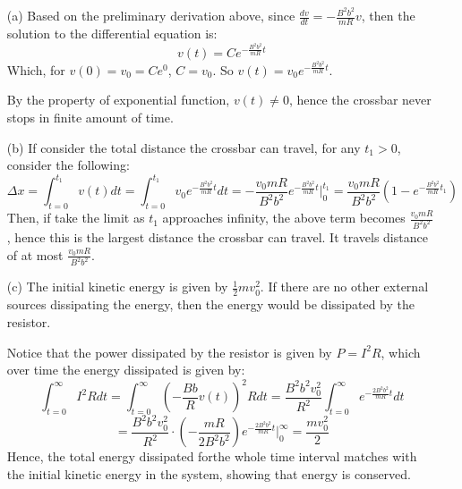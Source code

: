 \documentclass{article}
\begin{document}
\begin{itemize}
    \item[(a)] Based on the preliminary derivation above, since $\frac{dv}{dt}=-\frac{B^2b^2}{mR}v$, then the solution to the differential equation is:
    $$v(t)=Ce^{-\frac{B^2b^2}{mR}t}$$
    Which, for $v(0)=v_0=Ce^0$, $C=v_0$. So $v(t)=v_0e^{-\frac{B^2b^2}{mR}t}$.
    
    By the property of exponential function, $v(t)\neq 0$, hence the crossbar never stops in finite amount of time.

    \hfill

    \item[(b)] If consider the total distance the crossbar can travel, for any $t_1>0$, consider the following:
    $$\Delta x = \int_{t=0}^{t_1}v(t)dt = \int_{t=0}^{t_1}v_0e^{-\frac{B^2b^2}{mR}t}dt = -\frac{v_0mR}{B^2b^2}e^{-\frac{B^2b^2}{mR}t}\bigg|_{0}^{t_1} = \frac{v_0mR}{B^2b^2}\left(1-e^{-\frac{B^2b^2}{mR}t_1}\right)$$
    Then, if take the limit as $t_1$ approaches infinity, the above term becomes $\frac{v_0mR}{B^2b^2}$,
    hence this is the largest distance the crossbar can travel. It travels distance of at most $\frac{v_0mR}{B^2b^2}$.

    \hfill

    \item[(c)] The initial kinetic energy is given by $\frac{1}{2}mv_0^2$. If there are no other external sources dissipating the energy, then the energy would be dissipated by the resistor.
    
    Notice that the power dissipated by the resistor is given by $P=I^2R$, which over time the energy dissipated is given by:
    $$\int_{t=0}^{\infty}I^2Rdt = \int_{t=0}^{\infty}\left(-\frac{Bb}{R}v(t)\right)^2R dt = \frac{B^2b^2v_0^2}{R^2}\int_{t=0}^{\infty}e^{-\frac{2B^2b^2}{mR}t}dt$$
    $$=\frac{B^2b^2v_0^2}{R^2}\cdot\left(-\frac{mR}{2B^2b^2}\right)e^{-\frac{2B^2b^2}{mR}t}\bigg|_{0}^{\infty} = \frac{mv_0^2}{2}$$
    Hence, the total energy dissipated forthe whole time interval matches with the initial kinetic energy in the system,
    showing that energy is conserved.
    
\end{itemize}

\break
\end{document}
